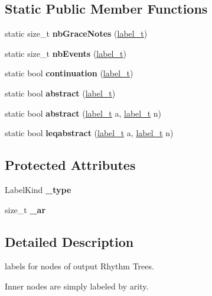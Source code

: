 \subsection*{Static Public Member Functions}
\begin{DoxyCompactItemize}
\item 
static size\+\_\+t {\bfseries nb\+Grace\+Notes} (\mbox{\hyperlink{group__output_ga22fde970e635fcf63962743b2d5c441d}{label\+\_\+t}})
\item 
static size\+\_\+t {\bfseries nb\+Events} (\mbox{\hyperlink{group__output_ga22fde970e635fcf63962743b2d5c441d}{label\+\_\+t}})
\item 
static bool {\bfseries continuation} (\mbox{\hyperlink{group__output_ga22fde970e635fcf63962743b2d5c441d}{label\+\_\+t}})
\item 
static bool {\bfseries abstract} (\mbox{\hyperlink{group__output_ga22fde970e635fcf63962743b2d5c441d}{label\+\_\+t}})
\item 
static bool {\bfseries abstract} (\mbox{\hyperlink{group__output_ga22fde970e635fcf63962743b2d5c441d}{label\+\_\+t}} a, \mbox{\hyperlink{group__output_ga22fde970e635fcf63962743b2d5c441d}{label\+\_\+t}} n)
\item 
static bool {\bfseries leqabstract} (\mbox{\hyperlink{group__output_ga22fde970e635fcf63962743b2d5c441d}{label\+\_\+t}} a, \mbox{\hyperlink{group__output_ga22fde970e635fcf63962743b2d5c441d}{label\+\_\+t}} n)
\end{DoxyCompactItemize}
\subsection*{Protected Attributes}
\begin{DoxyCompactItemize}
\item 
\mbox{\label{classLabel_a6a1180995fe66be113d8433f40251715}} 
Label\+Kind {\bfseries \+\_\+type}
\item 
\mbox{\label{classLabel_a072ec434ffc5fbe8bc4f8618e559dda6}} 
size\+\_\+t {\bfseries \+\_\+ar}
\end{DoxyCompactItemize}


\subsection{Detailed Description}
labels for nodes of output Rhythm Trees. 

Inner nodes are simply labeled by arity.

